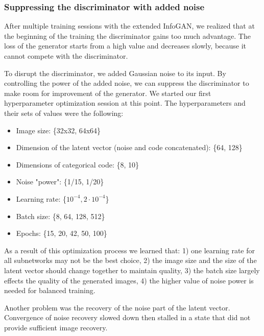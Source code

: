 \documentclass{egpubl}
\begin{document}
\subsubsection{Suppressing the discriminator with added noise}

After multiple training sessions with the extended InfoGAN, %
we realized that at the beginning of the training the discriminator gains too much advantage. The loss of the generator starts from a high value and decreases slowly, %
because it cannot compete with the discriminator.

To disrupt the discriminator, %
we added Gaussian noise to its input. By controlling the power of the added noise, %
we can suppress the discriminator to make room for improvement of the generator.
We started our first hyperparameter optimization session at this point. The hyperparameters and their sets of values were the following:

\begin{itemize}
	\item Image size: \{32x32, 64x64\}
	\item Dimension of the latent vector (noise and code concatenated): \{64, 128\}
	\item Dimensions of categorical code: \{8, 10\}
	\item Noise "power": \{1/15, 1/20\}
	\item Learning rate: \{$10^{-4}, 2 \cdot 10^{-4}$\}
	\item Batch size: \{8, 64, 128, 512\}
	\item Epochs: \{15, 20, 42, 50, 100\}
\end{itemize}

As a result of this optimization process we learned that: 1) one learning rate for all subnetworks may not be the best choice, 2) the image size and the size of the latent vector should change together to maintain quality, 3) the batch size largely effects the quality of the generated images, 4) the higher value of noise power is needed for balanced training.

Another problem was the recovery of the noise part of the latent vector. Convergence of noise recovery slowed down then stalled in a state that did not provide sufficient image recovery.
\end{document}
